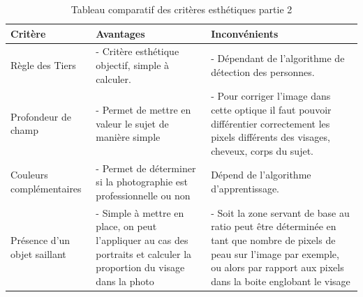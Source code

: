 \documentclass[11pt, french]{report-rd-info}
\begin{document}
\begin{table}
\begin{center}
\begin{tabular}{|p{3cm}|p{6cm}|p{7cm}|}
\hline
\textbf{Critère} & \textbf{Avantages} & \textbf{Inconvénients} \\ \hline
Règle des Tiers & - Critère esthétique objectif, simple à calculer. & - Dépendant de l'algorithme de détection des personnes. \\ \hline
Profondeur de champ & - Permet de mettre en valeur le sujet de manière simple & - Pour corriger l'image dans cette optique il faut pouvoir différentier correctement les pixels différents des visages, cheveux, corps du sujet. \\ \hline
Couleurs complémentaires & - Permet de déterminer si la photographie est professionnelle ou non & Dépend de l’algorithme d'apprentissage. \\ \hline
Présence d'un objet saillant & - Simple à mettre en place, on peut l'appliquer au cas des portraits et calculer la proportion du visage dans la photo & - Soit la zone servant de base au ratio peut être déterminée en tant que nombre de pixels de peau sur l'image par exemple, ou alors par rapport aux pixels dans la boite englobant le visage \\ \hline
\end{tabular}
\end{center}
\caption{Tableau comparatif des critères esthétiques partie 2}
\label{tab:ComparaisonCriteres2}
\end{table}
\end{document}
